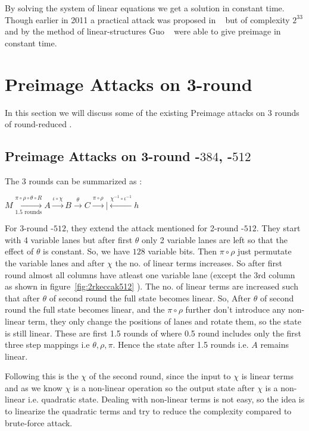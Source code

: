 	By solving the system of linear equations we get a solution in constant time. Though earlier in 2011 a practical attack was proposed in ~\cite{naya2011practical} but of complexity $2^{33}$ and by the method of linear-structures Guo \etal ~\cite{guo2016linear} were able to give preimage in constant time.

\section{Preimage Attacks on 3-round \KECCAK}

In this section we will discuss some of the existing Preimage attacks on 3 rounds of round-reduced \KECCAK{}.

\subsection{Preimage Attacks on 3-round \KECCAK-$384$, \KECCAK-$512$}

		The 3 rounds can be summarized as :
    
    $ M \xrightarrow[\text{1.5 rounds}]{ \pi \circ \rho \circ \theta \circ R} A \xrightarrow[]{ \iota \circ \chi } B \xrightarrow[]{ \theta } C \xrightarrow[]{ \pi \circ \rho } | \xleftarrow[]{ \chi^{-1} \circ \iota^{-1} } h  $

		For 3-round \KECCAK-$512$, they extend the attack mentioned for 2-round \KECCAK-$512$. They start with 4 variable lanes but after first $\theta$ only 2 variable lanes are left so that the effect of $\theta$ is constant. So, we have $128$ variable bits. Then $\pi \circ \rho$ just permutate the variable lanes and after $\chi$ the no. of linear terms increases. So after first round almost all columns have atleast one variable lane (except the 3rd column as shown in figure~\ref{fig:2rkeccak512} ). The no. of linear terms are increased such that after $\theta$ of second round the full state becomes linear. So, After $\theta$ of second round the full state becomes linear, and the $\pi \circ \rho$ further don't introduce any non-linear term, they only change the positions of lanes and rotate them, so the state is still linear.  These are first 1.5 rounds of \KECCAK{} where 0.5 round includes only the first three step mappings i.e $\theta, \rho, \pi$. Hence the state after 1.5 rounds i.e. $A$ remains linear.
		
		Following this is the $\chi$ of the second round, since the input to $\chi$ is linear terms and as we know $\chi$ is a non-linear operation so the output state after $\chi$ is a non-linear i.e. quadratic state. Dealing with non-linear terms is not easy, so the idea is to linearize the quadratic terms and try to reduce the complexity compared to brute-force attack.

